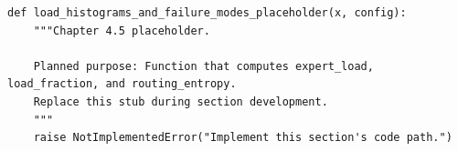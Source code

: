 \begin{lstlisting}[style=bookpython,caption={Planned code placeholder for load histograms and failure modes.},label={lst:ch04-load-histograms-and-failure-modes}]
def load_histograms_and_failure_modes_placeholder(x, config):
    """Chapter 4.5 placeholder.

    Planned purpose: Function that computes expert_load, load_fraction, and routing_entropy.
    Replace this stub during section development.
    """
    raise NotImplementedError("Implement this section's code path.")
\end{lstlisting}
